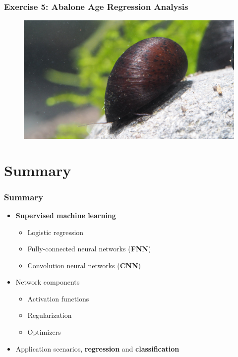 \documentclass[aspectratio=1610]{beamer}
\newcommand\imageright[1]{ %
    \caption*{\scalebox{.5}{\textcolor{lightgray}{\textcopyright~#1}}} %
}
\begin{document}
\begin{frame}
    \frametitle{Exercise 5: Abalone Age Regression Analysis}
    \begin{figure}
        \centering
        \includegraphics[width=0.7\linewidth]{abalone.jpg}
        \imageright{Garnelaxia}
    \end{figure}
\end{frame}

\section{Summary}
\label{sec:summary}

\begin{frame}
\frametitle{Summary}

\begin{itemize}
    \item \textbf{Supervised machine learning}
    \begin{itemize}
        \item Logistic regression
        \item Fully-connected neural networks (\textbf{FNN})
        \item Convolution neural networks (\textbf{CNN})
    \end{itemize}
    \item Network components
    \begin{itemize}
        \item Activation functions
        \item Regularization
        \item Optimizers
    \end{itemize}
    \item Application scenarios, \textbf{regression} and \textbf{classification}
\end{itemize}
\end{frame}
\end{document}
